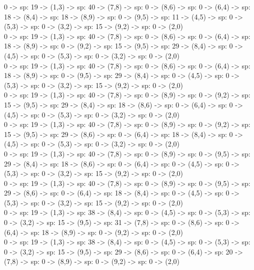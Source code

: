\documentclass[10pt,a4paper]{article}
\begin{document}
0 -> sp: 19 -> (1,3) -> sp: 40 -> (7,8) -> sp: 0 -> (8,6) -> sp: 0 -> (6,4) -> sp: 18 -> (8,4) -> sp: 18 -> (8,9) -> sp: 0 -> (9,5) -> sp: 11 -> (4,5) -> sp: 0 -> (5,3) -> sp: 0 -> (3,2) -> sp: 15 -> (9,2) -> sp: 0 -> (2,0)\\

0 -> sp: 19 -> (1,3) -> sp: 40 -> (7,8) -> sp: 0 -> (8,6) -> sp: 0 -> (6,4) -> sp: 18 -> (8,9) -> sp: 0 -> (9,2) -> sp: 15 -> (9,5) -> sp: 29 -> (8,4) -> sp: 0 -> (4,5) -> sp: 0 -> (5,3) -> sp: 0 -> (3,2) -> sp: 0 -> (2,0)\\

0 -> sp: 19 -> (1,3) -> sp: 40 -> (7,8) -> sp: 0 -> (8,6) -> sp: 0 -> (6,4) -> sp: 18 -> (8,9) -> sp: 0 -> (9,5) -> sp: 29 -> (8,4) -> sp: 0 -> (4,5) -> sp: 0 -> (5,3) -> sp: 0 -> (3,2) -> sp: 15 -> (9,2) -> sp: 0 -> (2,0)\\

0 -> sp: 19 -> (1,3) -> sp: 40 -> (7,8) -> sp: 0 -> (8,9) -> sp: 0 -> (9,2) -> sp: 15 -> (9,5) -> sp: 29 -> (8,4) -> sp: 18 -> (8,6) -> sp: 0 -> (6,4) -> sp: 0 -> (4,5) -> sp: 0 -> (5,3) -> sp: 0 -> (3,2) -> sp: 0 -> (2,0)\\

0 -> sp: 19 -> (1,3) -> sp: 40 -> (7,8) -> sp: 0 -> (8,9) -> sp: 0 -> (9,2) -> sp: 15 -> (9,5) -> sp: 29 -> (8,6) -> sp: 0 -> (6,4) -> sp: 18 -> (8,4) -> sp: 0 -> (4,5) -> sp: 0 -> (5,3) -> sp: 0 -> (3,2) -> sp: 0 -> (2,0)\\

0 -> sp: 19 -> (1,3) -> sp: 40 -> (7,8) -> sp: 0 -> (8,9) -> sp: 0 -> (9,5) -> sp: 29 -> (8,4) -> sp: 18 -> (8,6) -> sp: 0 -> (6,4) -> sp: 0 -> (4,5) -> sp: 0 -> (5,3) -> sp: 0 -> (3,2) -> sp: 15 -> (9,2) -> sp: 0 -> (2,0)\\

0 -> sp: 19 -> (1,3) -> sp: 40 -> (7,8) -> sp: 0 -> (8,9) -> sp: 0 -> (9,5) -> sp: 29 -> (8,6) -> sp: 0 -> (6,4) -> sp: 18 -> (8,4) -> sp: 0 -> (4,5) -> sp: 0 -> (5,3) -> sp: 0 -> (3,2) -> sp: 15 -> (9,2) -> sp: 0 -> (2,0)\\

0 -> sp: 19 -> (1,3) -> sp: 38 -> (8,4) -> sp: 0 -> (4,5) -> sp: 0 -> (5,3) -> sp: 0 -> (3,2) -> sp: 15 -> (9,5) -> sp: 31 -> (7,8) -> sp: 0 -> (8,6) -> sp: 0 -> (6,4) -> sp: 18 -> (8,9) -> sp: 0 -> (9,2) -> sp: 0 -> (2,0)\\

0 -> sp: 19 -> (1,3) -> sp: 38 -> (8,4) -> sp: 0 -> (4,5) -> sp: 0 -> (5,3) -> sp: 0 -> (3,2) -> sp: 15 -> (9,5) -> sp: 29 -> (8,6) -> sp: 0 -> (6,4) -> sp: 20 -> (7,8) -> sp: 0 -> (8,9) -> sp: 0 -> (9,2) -> sp: 0 -> (2,0)\\
\end{document}
